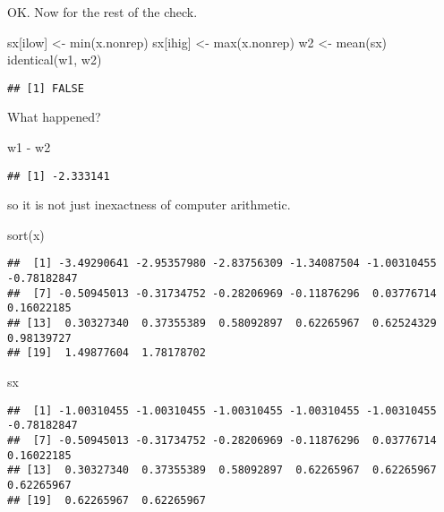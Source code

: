 \documentclass[
]{article}
\newenvironment{Shaded}{\begin{snugshade}}{\end{snugshade}}
\newcommand{\FunctionTok}[1]{\textcolor[rgb]{0.00,0.00,0.00}{#1}}
\newcommand{\NormalTok}[1]{#1}
\newcommand{\OtherTok}[1]{\textcolor[rgb]{0.56,0.35,0.01}{#1}}
\newcommand{\SpecialCharTok}[1]{\textcolor[rgb]{0.00,0.00,0.00}{#1}}
\begin{document}
OK. Now for the rest of the check.

\begin{Shaded}
\begin{Highlighting}[]
\NormalTok{sx[ilow] }\OtherTok{\textless{}{-}} \FunctionTok{min}\NormalTok{(x.nonrep)}
\NormalTok{sx[ihig] }\OtherTok{\textless{}{-}} \FunctionTok{max}\NormalTok{(x.nonrep)}
\NormalTok{w2 }\OtherTok{\textless{}{-}} \FunctionTok{mean}\NormalTok{(sx)}
\FunctionTok{identical}\NormalTok{(w1, w2)}
\end{Highlighting}
\end{Shaded}

\begin{verbatim}
## [1] FALSE
\end{verbatim}

What happened?

\begin{Shaded}
\begin{Highlighting}[]
\NormalTok{w1 }\SpecialCharTok{{-}}\NormalTok{ w2}
\end{Highlighting}
\end{Shaded}

\begin{verbatim}
## [1] -2.333141
\end{verbatim}

so it is not just inexactness of computer arithmetic.

\begin{Shaded}
\begin{Highlighting}[]
\FunctionTok{sort}\NormalTok{(x)}
\end{Highlighting}
\end{Shaded}

\begin{verbatim}
##  [1] -3.49290641 -2.95357980 -2.83756309 -1.34087504 -1.00310455 -0.78182847
##  [7] -0.50945013 -0.31734752 -0.28206969 -0.11876296  0.03776714  0.16022185
## [13]  0.30327340  0.37355389  0.58092897  0.62265967  0.62524329  0.98139727
## [19]  1.49877604  1.78178702
\end{verbatim}

\begin{Shaded}
\begin{Highlighting}[]
\NormalTok{sx}
\end{Highlighting}
\end{Shaded}

\begin{verbatim}
##  [1] -1.00310455 -1.00310455 -1.00310455 -1.00310455 -1.00310455 -0.78182847
##  [7] -0.50945013 -0.31734752 -0.28206969 -0.11876296  0.03776714  0.16022185
## [13]  0.30327340  0.37355389  0.58092897  0.62265967  0.62265967  0.62265967
## [19]  0.62265967  0.62265967
\end{verbatim}
\end{document}
